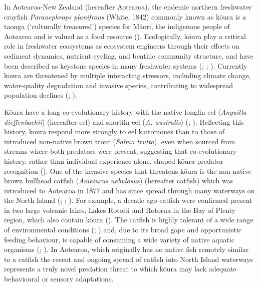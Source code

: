 \documentclass[
  letterpaper,
  DIV=11,
  numbers=noendperiod]{scrartcl}
\begin{document}
In Aotearoa-New Zealand (hereafter Aotearoa), the endemic northern
freshwater crayfish \emph{Paranephrops planifrons} (White, 1842)
commonly known as kōura is a taonga (`culturally treasured') species for
Māori, the indigenous people of Aotearoa and is valued as a food
resource ().
Ecologically, kōura play a critical role in freshwater ecosystems as
ecosystem engineers through their effects on sediment dynamics, nutrient
cycling, and benthic community structure, and have been described as
keystone species in many freshwater systems
(;
;
). Currently kōura are
threatened by multiple interacting stressors, including climate change,
water-quality degradation and invasive species, contributing to
widespread population declines (; ).

Kōura have a long co-evolutionary history with the native longfin eel
(\emph{Anguilla dieffenbachii}) (hereafter eel) and shortfin eel
(\emph{A. australis}) (;
). Reflecting this
history, kōura respond more strongly to eel kairomones than to those of
introduced non-native brown trout (\emph{Salmo trutta}), even when
sourced from streams where both predators were present, suggesting that
co-evolutionary history, rather than individual experience alone, shaped
kōura predator recognition (). One of the invasive species that threatens kōura is the
non-native brown bullhead catfish (\emph{Ameiurus nebulosus}) (hereafter
catfish) which was introduced to Aotearoa in 1877 and has since spread
through many waterways on the North Island
(;
;
). For example, a decade ago
catfish were confirmed present in two large volcanic lakes, Lakes
Rotoiti and Rotorua in the Bay of Plenty region, which also contain
kōura (). The catfish is highly
tolerant of a wide range of environmental conditions
(;
) and, due to its broad
gape and opportunistic feeding behaviour, is capable of consuming a wide
variety of native aquatic organisms (; ). In Aotearoa,
which originally has no native fish remotely similar to a catfish the
recent and ongoing spread of catfish into North Island waterways
represents a truly novel predation threat to which kōura may lack
adequate behavioural or sensory adaptations.
\end{document}

